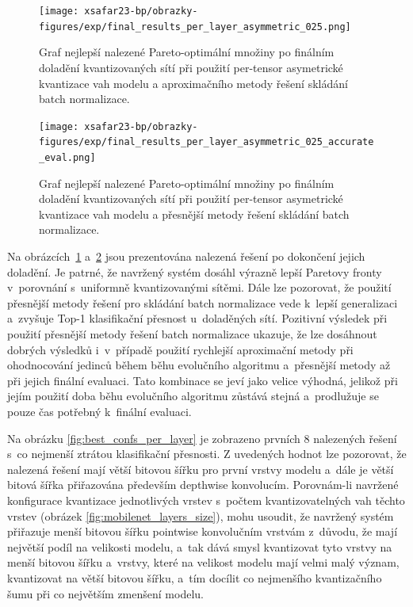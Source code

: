 \begin{figure}[H]
\centering
\texttt{[image: xsafar23-bp/obrazky-figures/exp/final\_results\_per\_layer\_asymmetric\_025.png]}
\caption{Graf nejlepší nalezené Pareto-optimální množiny po finálním doladění kvantizovaných sítí při použití per-tensor asymetrické kvantizace vah modelu a aproximačního metody řešení skládání batch normalizace.}
\label{fig:final_results_per_layer_approx}
\end{figure}

\begin{figure}[H]
\centering
\texttt{[image: xsafar23-bp/obrazky-figures/exp/final\_results\_per\_layer\_asymmetric\_025\_accurate\_eval.png]}
\caption{Graf nejlepší nalezené Pareto-optimální množiny po finálním doladění kvantizovaných sítí při použití per-tensor asymetrické kvantizace vah modelu a přesnější metody řešení skládání batch normalizace.}
\label{fig:final_results_per_layer_acc}
\end{figure}

Na obrázcích~\ref{fig:final_results_per_layer_approx} a~\ref{fig:final_results_per_layer_acc} jsou prezentována nalezená řešení po dokončení jejich doladění. Je patrné, že navržený systém dosáhl výrazně lepší Paretovy fronty v~porovnání s~uniformně kvantizovanými sítěmi. Dále lze pozorovat, že použití přesnější metody řešení pro skládání batch normalizace vede k~lepší generalizaci a~zvyšuje Top-1 klasifikační přesnost u~doladěných sítí. Pozitivní výsledek při použití přesnější metody řešení batch normalizace ukazuje, že lze dosáhnout dobrých výsledků i~v~případě použití rychlejší aproximační metody při ohodnocování jedinců během běhu evolučního algoritmu a~přesnější metody až při jejich finální evaluaci. Tato kombinace se jeví jako velice výhodná, jelikož při jejím použití doba běhu evolučního algoritmu zůstává stejná a~prodlužuje se pouze čas potřebný k~finální evaluaci. 

Na obrázku \ref{fig:best_confs_per_layer} je zobrazeno prvních 8 nalezených řešení s~co nejmenší ztrátou klasifikační přesnosti. Z uvedených hodnot lze pozorovat, že nalezená řešení mají větší bitovou šířku pro první vrstvy modelu a~dále je větší bitová šířka přiřazována především depthwise konvolucím. Porovnám-li navržené konfigurace kvantizace jednotlivých vrstev s~počtem kvantizovatelných vah těchto vrstev (obrázek \ref{fig:mobilenet_layers_size}), mohu usoudit, že navržený systém přiřazuje menší bitovou šířku pointwise konvolučním vrstvám z~důvodu, že  mají největší podíl na velikosti modelu, a~tak dává smysl kvantizovat tyto vrstvy na menší bitovou šířku a~vrstvy, které na velikost modelu mají velmi malý význam, kvantizovat na větší bitovou šířku, a~tím docílit co nejmenšího kvantizačního šumu při co největším zmenšení modelu.

